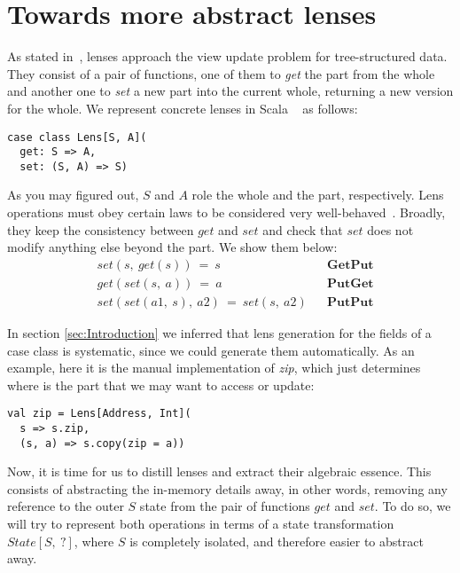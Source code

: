 \documentclass[final, twocolumn, 3p]{elsarticle}
\begin{document}
\section{Towards more abstract lenses}
\label{sec:Towards}

As stated in~\cite{foster2005combinators}, lenses approach the view update
problem for tree-structured data. They consist of a pair of functions, one of
them to \emph{get} the part from the whole and another one to \emph{set} a new
part into the current whole, returning a new version for the whole. We represent
concrete lenses in Scala ~\cite{morris2012asymmetric} as follows:

\begin{lstlisting}
case class Lens[S, A](
  get: S => A,
  set: (S, A) => S)
\end{lstlisting}

As you may figured out, $S$ and $A$ role the whole and the part, respectively.
Lens operations must obey certain laws to be considered very
well-behaved~\cite{fischer2015clear}. Broadly, they keep the consistency between
$get$ and $set$ and check that $set$ does not modify anything else beyond the
part. We show them below:
\begin{align*}
  & set(s,\ get(s))\ =\ s &&\textbf{GetPut} \\
  & get(set(s,\ a))\ =\ a &&\textbf{PutGet} \\
  & set(set(a1,\ s),\ a2)\ =\ set(s,\ a2) &&\textbf{PutPut}
\end{align*}

In section \ref{sec:Introduction} we inferred that lens generation for the
fields of a case class is systematic, since we could generate them
automatically. As an example, here it is the manual implementation of
\emph{zip}, which just determines where is the part that we may want to access
or update:

\begin{lstlisting}
val zip = Lens[Address, Int](
  s => s.zip,
  (s, a) => s.copy(zip = a))
\end{lstlisting}

Now, it is time for us to distill lenses and extract their algebraic essence.
This consists of abstracting the in-memory details away, in other words,
removing any reference to the outer $S$ state from the pair of functions $get$
and $set$. To do so, we will try to represent both operations in terms of a
state transformation $State[S,\ ?]$, where $S$ is completely isolated, and
therefore easier to abstract away.
\end{document}
